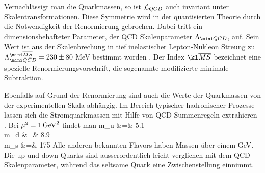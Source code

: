 Vernachl\"assigt man die Quarkmassen, so ist ${\cal L}_{QCD}$ auch
invariant unter Skalentransformationen. Diese Symmetrie wird in der
quantisierten Theorie durch die Notwendigkeit der Renormierung
gebrochen. Dabei tritt ein dimensionsbehafteter Parameter, der
QCD Skalenparameter $\Lambda_{\mini QCD}$, auf. Sein Wert ist aus der
Skalenbrechung in tief inelastischer Lepton-Nukleon Streung zu
$\Lambda_{\mini QCD}^{\mini\overline{MS}} =230\pm 80$ MeV bestimmt worden
\cite{PDG90}. Der Index ${\kl \overline{MS}}$ bezeichnet eine spezielle
Renormierungsvorschrift, die sogenannte modifizierte minimale 
Subtraktion.

Ebenfalls auf Grund der Renormierung sind  auch die Werte der 
Quarkmassen von der experimentellen Skala abh\"angig.
Im Bereich typischer hadronischer Prozesse lassen sich 
die Stromquarkmassen mit Hilfe von QCD-Summenregeln 
extrahieren \cite{GL82}. Bei $\mu^2=1\,{\rm GeV}^2$ findet man
\cite{Leu89}
\beq
   m_u &=& 5.1   \nonumber  \\
   m_d &=& 8.9   \\
   m_s &=& 175    \nonumber
\eeq   
Alle anderen bekannten Flavors haben Massen \"uber einem GeV. Die
up und down Quarks sind ausserordentlich leicht verglichen mit dem
QCD Skalenparameter, w\"ahrend das seltsame Quark eine Zwischenstellung
einnimmt.   

